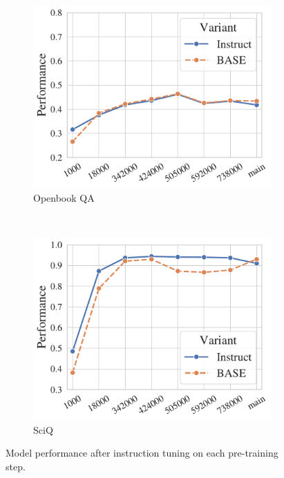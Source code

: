 \begin{figure}[t!]
\begin{subfigure}[b]{0.3\textwidth}
    \includegraphics[width=\the\columnwidth]{figures/fig_files/it_ckpts/it_evalopenbookqa.pdf}
        \caption{Openbook QA}
    \end{subfigure}%
    ~ 
    \begin{subfigure}[b]{0.3\textwidth}
    \includegraphics[width=\the\columnwidth]{figures/fig_files/it_ckpts/it_evalsciq.pdf}
        \caption{SciQ}
    \end{subfigure}%
    \caption{Model performance after instruction tuning on each pre-training step.}
    \label{fig:it-ckpt-perf}
\end{figure}